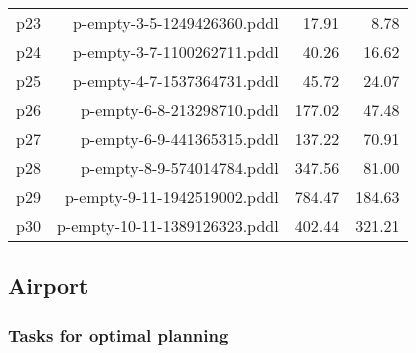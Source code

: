 \documentclass{article}
\begin{document}
\begin{center}
\begin{tabular}{@{}l|r|r|r@{}}
  p23& p-empty-3-5-1249426360.pddl&17.91&8.78\\
  p24& p-empty-3-7-1100262711.pddl&40.26&16.62\\
  p25& p-empty-4-7-1537364731.pddl&45.72&24.07\\
  p26& p-empty-6-8-213298710.pddl&177.02&47.48\\
  p27& p-empty-6-9-441365315.pddl&137.22&70.91\\
  p28& p-empty-8-9-574014784.pddl&347.56&81.00\\
  p29& p-empty-9-11-1942519002.pddl&784.47&184.63\\
  p30& p-empty-10-11-1389126323.pddl&402.44&321.21
                            \end{tabular}
                            \end{center}
                    
                \newpage \subsection{Airport}
                    \subsubsection*{Tasks for optimal planning}
                    
\end{document}
